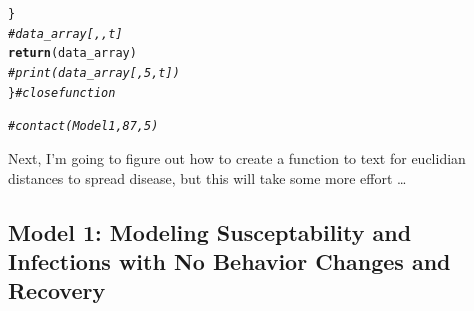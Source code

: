 \documentclass{article}\usepackage[]{graphicx}\usepackage[]{color}
\makeatletter
\newcommand{\hlcom}[1]{\textcolor[rgb]{0.678,0.584,0.686}{\textit{#1}}}%
\newcommand{\hlstd}[1]{\textcolor[rgb]{0.345,0.345,0.345}{#1}}%
\newcommand{\hlkwd}[1]{\textcolor[rgb]{0.737,0.353,0.396}{\textbf{#1}}}%
\newenvironment{kframe}{%
 \def\at@end@of@kframe{}%
 \ifinner\ifhmode%
  \def\at@end@of@kframe{\end{minipage}}%
  \begin{minipage}{\columnwidth}%
 \fi\fi%
 \def\FrameCommand##1{\hskip\@totalleftmargin \hskip-\fboxsep
 \colorbox{shadecolor}{##1}\hskip-\fboxsep
     \hskip-\linewidth \hskip-\@totalleftmargin \hskip\columnwidth}%
 \MakeFramed {\advance\hsize-\width
   \@totalleftmargin\z@ \linewidth\hsize
   \@setminipage}}%
 {\par\unskip\endMakeFramed%
 \at@end@of@kframe}
\newenvironment{knitrout}{}{} %
\makeatother
\begin{document}
\begin{knitrout}
\begin{kframe}
\begin{alltt}
  \hlstd{\}}
   \hlcom{# data_array[,,t]}
\hlkwd{return}\hlstd{(data_array)}
\hlcom{# print(data_array[,5,t])}
\hlstd{\}} \hlcom{# close function}

\hlcom{#contact(Model1, 87, 5)}
\end{alltt}
\end{kframe}
\end{knitrout}

Next, I'm going to figure out how to create a function to text for euclidian distances to spread disease, but this will take some more effort \ldots

\subsection{Model 1: Modeling Susceptability and Infections  with No Behavior Changes and Recovery}
\end{document}
